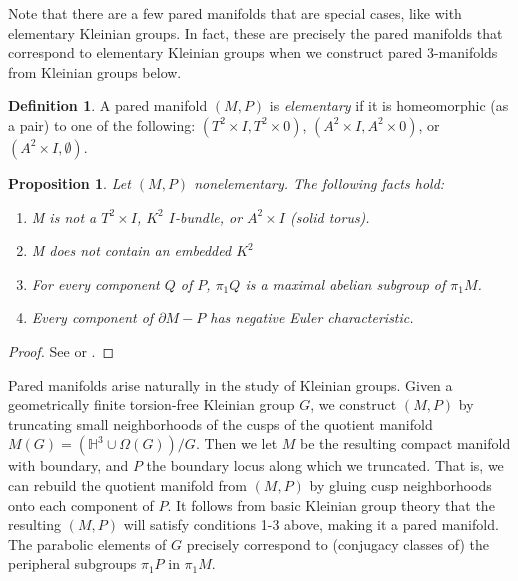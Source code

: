 \documentclass[12pt]{amsart}
\newtheorem{prop}[theorem]{Proposition}
\theoremstyle{definition}
\newtheorem{defn}[theorem]{Definition}
\theoremstyle{remark}
\newcommand{\x}{\times}
\newcommand{\bd}{\partial}
\newcommand{\Om}{\Omega}
\begin{document}
Note that there are a few pared manifolds that are special cases, like with
elementary Kleinian groups. In fact, these are precisely the pared manifolds
that correspond to elementary Kleinian groups when we construct pared
3-manifolds from Kleinian groups below.

\begin{defn}

A pared manifold $(M,P)$ is \emph{elementary} if it is homeomorphic (as a pair)
to one of the following: $(T^2\x I,T^2\x 0)$, $(A^2\x I,A^2\x 0)$, or $(A^2\x
I,\emptyset)$.

\end{defn}

\begin{prop}

Let $(M,P)$ nonelementary. The following facts hold:

\begin{enumerate}
\item M is not a $T^2\x I$, $K^2$ $I$-bundle, or $A^2\x I$ (solid torus).
\item M does not contain an embedded $K^2$
\item For every component $Q$ of $P$, $\pi_1Q$ is a maximal abelian subgroup of
$\pi_1M$.
\item Every component of $\bd M-P$ has negative Euler characteristic.
\end{enumerate}

\end{prop}
\begin{proof}
See \cite{CMc} or \cite{Mo}.
\end{proof}

Pared manifolds arise naturally in the study of Kleinian groups. Given
a geometrically finite torsion-free Kleinian group $G$, we construct $(M,P)$ by
truncating small neighborhoods of the cusps of the quotient manifold $M(G)
= \left(\mathbb{H}^3\cup \Om(G)\right)/G$.  Then we let $M$ be the resulting
compact manifold with boundary, and $P$ the boundary locus along which we
truncated.  That is, we can rebuild the quotient manifold from $(M,P)$ by
gluing cusp neighborhoods onto each component of $P$. It follows from basic
Kleinian group theory that the resulting $(M,P)$ will satisfy conditions 1-3
above, making it a pared manifold.  The parabolic elements of $G$ precisely
correspond to (conjugacy classes of) the peripheral subgroups $\pi_1P$ in
$\pi_1M$.
\end{document}
